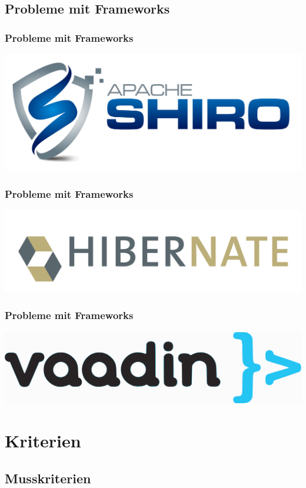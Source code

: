 \subsection{Probleme mit Frameworks}

\begin{frame}
	\frametitle{Probleme mit Frameworks}
	\includegraphics{images/shiro-logo.png}
\end{frame}

\begin{frame}
	\frametitle{Probleme mit Frameworks}
	\includegraphics{images/hibernate-logo.png}
\end{frame}

\begin{frame}
	\frametitle{Probleme mit Frameworks}
	\includegraphics{images/vaadin-logo.png}
\end{frame}



\section{Kriterien}

\subsection{Musskriterien}


